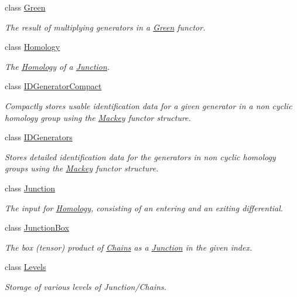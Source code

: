 \begin{DoxyCompactItemize}
class \hyperlink{classMackey_1_1Green}{Green}
\begin{DoxyCompactList}\small\item\em The result of multiplying generators in a \hyperlink{classMackey_1_1Green}{Green} functor. \end{DoxyCompactList}\item 
class \hyperlink{classMackey_1_1Homology}{Homology}
\begin{DoxyCompactList}\small\item\em The \hyperlink{classMackey_1_1Homology}{Homology} of a \hyperlink{classMackey_1_1Junction}{Junction}. \end{DoxyCompactList}\item 
class \hyperlink{classMackey_1_1IDGeneratorCompact}{I\+D\+Generator\+Compact}
\begin{DoxyCompactList}\small\item\em Compactly stores usable identification data for a given generator in a non cyclic homology group using the \hyperlink{namespaceMackey}{Mackey} functor structure. \end{DoxyCompactList}\item 
class \hyperlink{classMackey_1_1IDGenerators}{I\+D\+Generators}
\begin{DoxyCompactList}\small\item\em Stores detailed identification data for the generators in non cyclic homology groups using the \hyperlink{namespaceMackey}{Mackey} functor structure. \end{DoxyCompactList}\item 
class \hyperlink{classMackey_1_1Junction}{Junction}
\begin{DoxyCompactList}\small\item\em The input for \hyperlink{classMackey_1_1Homology}{Homology}, consisting of an entering and an exiting differential. \end{DoxyCompactList}\item 
class \hyperlink{classMackey_1_1JunctionBox}{Junction\+Box}
\begin{DoxyCompactList}\small\item\em The box (tensor) product of \hyperlink{classMackey_1_1Chains}{Chains} as a \hyperlink{classMackey_1_1Junction}{Junction} in the given index. \end{DoxyCompactList}\item 
class \hyperlink{classMackey_1_1Levels}{Levels}
\begin{DoxyCompactList}\small\item\em Storage of various levels of Junction/\+Chains. \end{DoxyCompactList}\item 

\end{DoxyCompactItemize}
